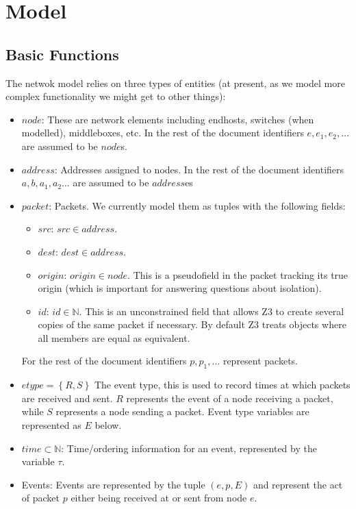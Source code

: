 \section{Model}
\subsection{Basic Functions}
The netwok model relies on three types of entities (at present, as we model more complex functionality we might get to
other things):

\begin{itemize}
\item $node$: These are network elements including endhosts, switches (when modelled), middleboxes, etc. In the rest of
the document identifiers $e, e_1, e_2, \ldots$ are assumed to be $node$s.
\item $address$: Addresses assigned to nodes. In the rest of the document identifiers $a, b, a_1, a_2\ldots$ are assumed
to be $address$es
\item $packet$: Packets. We currently model them as tuples with the following fields:
\begin{itemize}
\item $src$: $src\in address$.
\item $dest$: $dest\in address$.
\item $origin$: $origin\in node$. This is a pseudofield in the packet tracking its true origin (which is important for
answering questions about isolation).
\item $id$: $id\in \mathbb{N}$. This is an unconstrained field that allows Z3 to create several copies of the same packet if necessary. By default
Z3 treats objects where all members are equal as equivalent.
\end{itemize}
For the rest of the document identifiers $p, p_1,\ldots$ represent packets.
\item $etype = \left\{R, S\right\}$ The event type, this is used to record times at which packets are received and sent. $R$ represents
the event of a node receiving a packet, while $S$ represents a node sending a packet. Event type variables are represented as $E$ below.
\item $time \subset \mathbb{N}$: Time/ordering information for an event, represented by the variable $\tau$.
\item Events: Events are represented by the tuple $\left( e, p, E \right)$ and represent the act of packet $p$ either being received at or
sent from node $e$.
\end{itemize}

